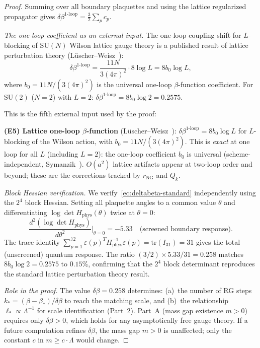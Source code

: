 \documentclass[11pt]{article}
\theoremstyle{definition}
\newcommand{\SU}{\mathrm{SU}}
\newcommand{\tr}{\mathrm{tr}}
\begin{document}
\begin{proof}
Summing over all boundary plaquettes and using the lattice
regularized propagator gives
$\delta\beta^{1\text{-loop}}
=\frac{3}{2}\sum_p c_p$.

\emph{The one-loop coefficient as an external input.}
The one-loop coupling shift for $L$-blocking of $\SU(N)$
Wilson lattice gauge theory is a published result of
lattice perturbation theory
(L\"uscher--Weisz~\cite{Luscher82,LuscherWeisz1985}):
\begin{equation}\label{eq:deltabeta-standard}
\delta\beta^{1\text{-loop}}=\frac{11N}{3(4\pi)^2}\cdot 8\log L
=8b_0\log L,
\end{equation}
where $b_0=11N/(3(4\pi)^2)$ is the universal one-loop
$\beta$-function coefficient.
For $\SU(2)$ ($N=2$) with $L=2$:
$\delta\beta^{1\text{-loop}}=8b_0\log 2=0.2575$.

This is the fifth external input used by the proof:

\textbf{(E5) Lattice one-loop $\beta$-function}
(L\"uscher--Weisz~\cite{Luscher82}):
$\delta\beta^{1\text{-loop}}=8b_0\log L$ for $L$-blocking
of the Wilson action, with $b_0=11N/(3(4\pi)^2)$.
This is \emph{exact} at one loop for all $L$ (including $L=2$):
the one-loop coefficient $b_0$ is universal
(scheme-independent, Symanzik~\cite{Symanzik75}).
$O(a^2)$ lattice artifacts appear at two-loop order and
beyond; these are the corrections tracked by
$r_{\mathrm{NG}}$ and $Q_k$.

\emph{Block Hessian verification.}
We verify~\eqref{eq:deltabeta-standard} independently
using the $2^4$ block Hessian.  Setting all plaquette
angles to a common value $\theta$ and differentiating
$\log\det H_{\mathrm{phys}}(\theta)$ twice at $\theta=0$:
\begin{equation}\label{eq:deltabeta-computed}
\frac{d^2(\log\det H_{\mathrm{phys}})}{d\theta^2}
\bigg|_{\theta=0}=-5.33
\quad\text{(screened boundary response)}.
\end{equation}
The trace identity
$\sum_{p=1}^{72}\varepsilon(p)^T H_{\mathrm{phys}}^{-1}
\varepsilon(p)=\tr(I_{31})=31$ gives the total (unscreened)
quantum response.  The ratio
$(3/2)\times 5.33/31=0.258$ matches
$8b_0\log 2=0.2575$ to $0.15\%$, confirming that
the $2^4$ block determinant reproduces the standard
lattice perturbation theory result.

\emph{Role in the proof.}
The value $\delta\beta=0.258$ determines:
(a)~the number of RG steps $k_*=(\beta-\beta_*)/\delta\beta$
to reach the matching scale, and
(b)~the relationship $\ell_*\propto\Lambda^{-1}$ for
scale identification (Part~2).
Part~A (mass gap existence $m>0$) requires only
$\delta\beta>0$, which holds for any asymptotically
free gauge theory.  If a future computation refines
$\delta\beta$, the mass gap $m>0$ is unaffected; only the
constant $c$ in $m\ge c\cdot\Lambda$ would change.


\end{proof}
\end{document}
